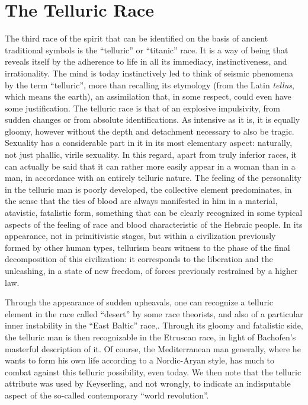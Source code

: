 \section{The Telluric Race}

The third race of the spirit that can be identified on the basis of ancient traditional symbols is the ``telluric'' or ``titanic'' race. It is a way of being that reveals itself by the adherence to life in all its immediacy, instinctiveness, and irrationality. The mind is today instinctively led to think of seismic phenomena by the term ``telluric'', more than recalling its etymology (from the Latin
\emph{tellus}, which means the earth), an assimilation that, in some respect, could even have some justification. The telluric race is that of an explosive impulsivity, from sudden changes or from absolute identifications. As intensive as it is, it is equally gloomy, however without the depth and detachment necessary to also be tragic. Sexuality has a considerable part in it in its most elementary aspect: naturally, not just phallic, virile sexuality. In this regard, apart from truly inferior races, it can actually be said that it can rather more easily appear in a woman than in a man, in accordance with an entirely telluric nature. The feeling of the personality in the telluric man is poorly developed, the collective element predominates, in the sense that the ties of blood are always manifested in him in a material, atavistic, fatalistic form, something that can be clearly recognized in some typical aspects of the feeling of race and blood characteristic of the Hebraic people. In its appearance, not in primitivistic stages, but within a civilization previously formed by other human types, tellurism bears witness to the phase of the final decomposition of this civilization: it corresponds to the liberation and the unleashing, in a state of new freedom, of forces previously restrained by a higher law.

Through the appearance of sudden upheavals, one can recognize a telluric element in the race called ``desert'' by some race theorists, and also of a particular inner instability in the ``East Baltic'' race,. Through its gloomy and fatalistic side, the telluric man is then recognizable in the Etruscan race, in light of Bachofen's masterful description of it. Of course, the Mediterranean man generally, where he wants to form his own life according to a Nordic-Aryan style, has much to combat against this telluric possibility, even today. We then note that the telluric attribute was used by Keyserling, and not wrongly, to indicate an indisputable aspect of the so-called contemporary ``world revolution''.

